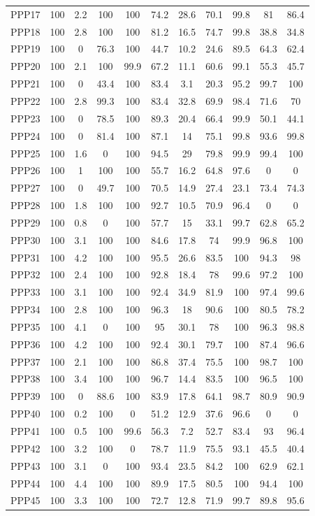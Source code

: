 \documentclass[authoryearcitations]{UoYCSproject}
\begin{document}
\begin{appendices}
\begin{table}
\begin{tabular}{|l|c|c|c|c|c|c|c|c|c|c|}
PPP17&100&2.2&100&100&74.2&28.6&70.1&99.8&81&86.4\\
PPP18&100&2.8&100&100&81.2&16.5&74.7&99.8&38.8&34.8\\
PPP19&100&0&76.3&100&44.7&10.2&24.6&89.5&64.3&62.4\\
PPP20&100&2.1&100&99.9&67.2&11.1&60.6&99.1&55.3&45.7\\
PPP21&100&0&43.4&100&83.4&3.1&20.3&95.2&99.7&100\\
PPP22&100&2.8&99.3&100&83.4&32.8&69.9&98.4&71.6&70\\
PPP23&100&0&78.5&100&89.3&20.4&66.4&99.9&50.1&44.1\\
PPP24&100&0&81.4&100&87.1&14&75.1&99.8&93.6&99.8\\
PPP25&100&1.6&0&100&94.5&29&79.8&99.9&99.4&100\\
PPP26&100&1&100&100&55.7&16.2&64.8&97.6&0&0\\
PPP27&100&0&49.7&100&70.5&14.9&27.4&23.1&73.4&74.3\\
PPP28&100&1.8&100&100&92.7&10.5&70.9&96.4&0&0\\
PPP29&100&0.8&0&100&57.7&15&33.1&99.7&62.8&65.2\\
PPP30&100&3.1&100&100&84.6&17.8&74&99.9&96.8&100\\
PPP31&100&4.2&100&100&95.5&26.6&83.5&100&94.3&98\\
PPP32&100&2.4&100&100&92.8&18.4&78&99.6&97.2&100\\
PPP33&100&3.1&100&100&92.4&34.9&81.9&100&97.4&99.6\\
PPP34&100&2.8&100&100&96.3&18&90.6&100&80.5&78.2\\
PPP35&100&4.1&0&100&95&30.1&78&100&96.3&98.8\\
PPP36&100&4.2&100&100&92.4&30.1&79.7&100&87.4&96.6\\
PPP37&100&2.1&100&100&86.8&37.4&75.5&100&98.7&100\\
PPP38&100&3.4&100&100&96.7&14.4&83.5&100&96.5&100\\
PPP39&100&0&88.6&100&83.9&17.8&64.1&98.7&80.9&90.9\\
PPP40&100&0.2&100&0&51.2&12.9&37.6&96.6&0&0\\
PPP41&100&0.5&100&99.6&56.3&7.2&52.7&83.4&93&96.4\\
PPP42&100&3.2&100&0&78.7&11.9&75.5&93.1&45.5&40.4\\
PPP43&100&3.1&0&100&93.4&23.5&84.2&100&62.9&62.1\\
PPP44&100&4.4&100&100&89.9&17.5&80.5&100&94.4&100\\
PPP45&100&3.3&100&100&72.7&12.8&71.9&99.7&89.8&95.6\\

\end{tabular}
\end{table}
\end{appendices}
\end{document}

